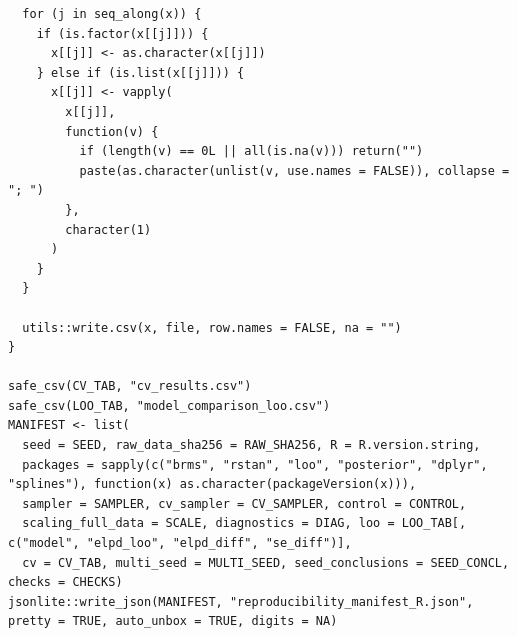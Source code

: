 \documentclass[
]{article}
\begin{document}
\begin{verbatim}
  for (j in seq_along(x)) {
    if (is.factor(x[[j]])) {
      x[[j]] <- as.character(x[[j]])
    } else if (is.list(x[[j]])) {
      x[[j]] <- vapply(
        x[[j]],
        function(v) {
          if (length(v) == 0L || all(is.na(v))) return("")
          paste(as.character(unlist(v, use.names = FALSE)), collapse = "; ")
        },
        character(1)
      )
    }
  }

  utils::write.csv(x, file, row.names = FALSE, na = "")
}

safe_csv(CV_TAB, "cv_results.csv")
safe_csv(LOO_TAB, "model_comparison_loo.csv")
MANIFEST <- list(
  seed = SEED, raw_data_sha256 = RAW_SHA256, R = R.version.string,
  packages = sapply(c("brms", "rstan", "loo", "posterior", "dplyr", "splines"), function(x) as.character(packageVersion(x))),
  sampler = SAMPLER, cv_sampler = CV_SAMPLER, control = CONTROL,
  scaling_full_data = SCALE, diagnostics = DIAG, loo = LOO_TAB[, c("model", "elpd_loo", "elpd_diff", "se_diff")],
  cv = CV_TAB, multi_seed = MULTI_SEED, seed_conclusions = SEED_CONCL, checks = CHECKS)
jsonlite::write_json(MANIFEST, "reproducibility_manifest_R.json", pretty = TRUE, auto_unbox = TRUE, digits = NA)
\end{verbatim}
\end{document}
